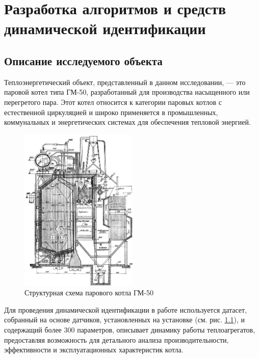 \chapter{Разработка алгоритмов и средств динамической идентификации}
 
\section{Описание исследуемого объекта}

Теплоэнергетический объект, представленный в данном исследовании, — это паровой
котел типа ГМ-50, разработанный для производства насыщенного или перегретого
пара. Этот котел относится к категории паровых котлов с естественной циркуляцией
и широко применяется в промышленных, коммунальных и энергетических системах для
обеспечения тепловой энергией. 

\begin{figure}[H]
  \begin{center}
    \includegraphics[width=0.5\textwidth]{figures/gm-50.jpg}
  \end{center}
  \caption{Структурная схема парового котла ГМ-50}\label{fig:gm50}
\end{figure}


Для проведения динамической идентификации в работе используется датасет,
собранный на основе датчиков, установленных на установке (см. рис.
\ref{fig:gm50}), и содержащий более 300 параметров, описывает динамику работы
теплоагрегатов, предоставляя возможность для детального анализа
производительности, эффективности и эксплуатационных характеристик котла.

